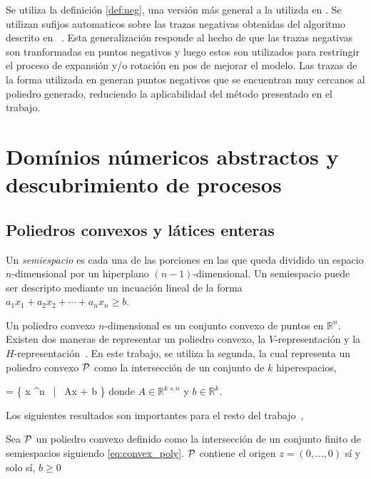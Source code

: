 Se utiliza la definición \autoref{def:neg}, una versión más general 
a la utilizda en \cite{Goedertier2009,BrouckeWVB14}. Se utilizan sufijos
automaticos sobre las trazas negativas obtenidas del algoritmo 
descrito en ~\cite{BrouckeWVB14}.
Esta generalización responde al hecho  de que las trazas negativas 
son tranformadas en puntos negativos y luego estos son utilizados
para restringir el proceso de expansión y/o rotación en pos de mejorar el modelo.
Las trazas de la forma utilizada en \cite{Goedertier2009,BrouckeWVB14} generan
puntos negativos que se encuentran muy cercanos al poliedro generado, reduciendo la aplicabilidad del 
método presentado en el trabajo.

\section{Domínios númericos abstractos y descubrimiento de procesos} 
\label{sec:2.discovery}

\subsection{Poliedros convexos y látices enteras} 
\label{sec:2.discovery polyhedra}

Un \textit{semiespacio} es cada
una de las porciones en las que queda dividido un espacio $n$-dimensional por un hiperplano $(n-1)$-dimensional. Un semiespacio
puede ser descripto mediante un incuación lineal de la forma $a_1x_1 + a_2x_2 + \cdots + a_nx_n \geq b$.

Un poliedro convexo $n$-dimensional es un conjunto convexo de puntos en $\mathbb{R}^n$. Existen 
dos maneras de representar un poliedro convexo, la $V$-representación y la $H$-representación~\cite{Rockafellar70}.
En este trabajo, se utiliza la segunda, la cual representa un poliedro convexo ${\mathcal P}$ 
como la intersección de un conjunto de $k$ hiperespacios,

    \ph = \{ x \in {}^n ~|~ A\cdot x + b \}
\eequation
donde  \mbox{$A \in \mathbb{R}^{k \times n}$} y
\mbox{$b\in\mathbb{R}^{k}$}.

Los siguientes resultados son importantes para el resto del trabajo~\cite{CarmonaC14},

\begin{theorem}
\label{theo:orig_in_b_pos}
    Sea ${\mathcal P}$ un poliedro convexo definido como la intersección de un conjunto
    finito de semiespacios siguiendo \eqref{eq:convex_poly}. ${\mathcal P}$ contiene el 
    origen \mbox{$z=(0,\ldots,0)$} sí y solo sí, $b \geq 0$
\end{theorem}

